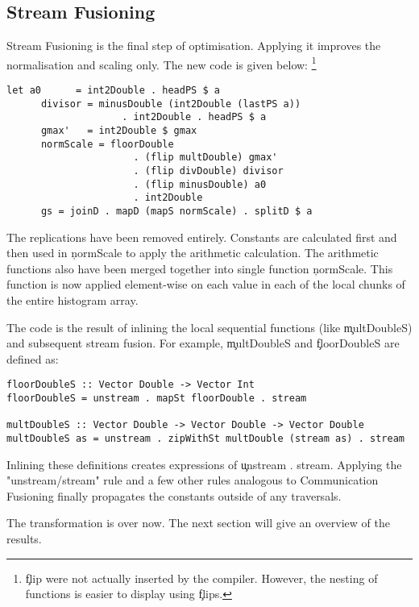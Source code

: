   \subsection{Stream Fusioning}
    Stream Fusioning is the final step of optimisation. Applying it improves
    the normalisation and scaling only. The new code is given below:
     \footnote{\c{flip} were not actually inserted by the compiler.
     However, the nesting of functions is easier to display
     using \c{flip}s.}
    \begin{lstlisting}
let a0      = int2Double . headPS $ a 
      divisor = minusDouble (int2Double (lastPS a))
                    . int2Double . headPS $ a
      gmax'   = int2Double $ gmax
      normScale = floorDouble
                      . (flip multDouble) gmax'
                      . (flip divDouble) divisor
                      . (flip minusDouble) a0
                      . int2Double
      gs = joinD . mapD (mapS normScale) . splitD $ a
     \end{lstlisting}
     The replications have been removed entirely.
     Constants are calculated first and then used in \c{normScale}
     to apply the arithmetic calculation.
     The arithmetic functions also have been merged together into
     single function \c{normScale}. This function is now applied element-wise
     on each value in each of the local chunks of the entire histogram array.
     
     The code is the result of inlining the local sequential functions (like \c{multDoubleS})
     and subsequent stream fusion.
     For example, \c{multDoubleS} and \c{floorDoubleS} are defined as:
     \begin{lstlisting}
floorDoubleS :: Vector Double -> Vector Int
floorDoubleS = unstream . mapSt floorDouble . stream

multDoubleS :: Vector Double -> Vector Double -> Vector Double
multDoubleS as = unstream . zipWithSt multDouble (stream as) . stream
     \end{lstlisting}
     Inlining these definitions creates expressions of \c{unstream . stream}. Applying
     the "unstream/stream" rule and a few other rules analogous to
     Communication Fusioning finally propagates the constants outside
     of any traversals.
     
     The transformation is over now. The next section will give an overview of the results.
         
